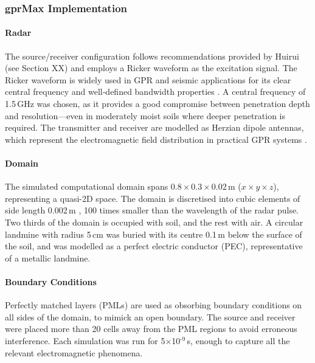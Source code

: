     
    
    \subsubsection{gprMax Implementation}

        \paragraph{Radar}
        
             The source/receiver configuration follows recommendations provided by Huirui (see Section XX) and employs a Ricker waveform as the excitation signal. The Ricker waveform is widely used in GPR and seismic applications for its clear central frequency and well‐defined bandwidth properties \cite{dummyRef2}. A central frequency of 1.5\,GHz was chosen, as it provides a good compromise between penetration depth and resolution—even in moderately moist soils where deeper penetration is required. The transmitter and receiver are modelled as Herzian dipole antennas, which represent the electromagnetic field distribution in practical GPR systems \cite{dummyRef3}.
    
        \paragraph{Domain}

            The simulated computational domain spans $0.8\times 0.3\times0.02$\,m ($x\times y\times z$), representing a quasi-2D space. The domain is discretised into cubic elements of side length 0.002\,m , 100 times smaller than the wavelength of the radar pulse. Two thirds of the domain is occupied with soil, and the rest with air. A circular landmine with radius 5\,cm was buried with its centre 0.1\,m below the surface of the soil, and was modelled as a perfect electric conductor (PEC), representative of a metallic landmine.


        \paragraph{Boundary Conditions}
        
            Perfectly matched layers (PMLs) are used as obsorbing boundary conditions on all sides of the domain, to mimick an open boundary. The source and receiver were placed more than 20 cells away from the PML regions to avoid erroneous interference. Each simulation was run for 5$\times$10$^{\text{-9}}$\,s, enough to capture all the relevant electromagnetic phenomena.

